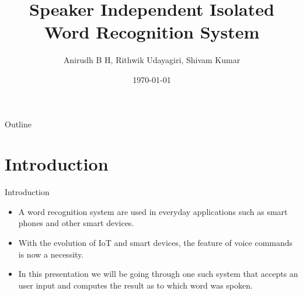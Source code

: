 \documentclass{beamer}
\title[Word Recognition]{Speaker Independent Isolated Word Recognition System}
\author[Anirudh, Rithwik, Shivam]{Anirudh B H, Rithwik Udayagiri, Shivam Kumar}
\institute[]{National Institue of Techology Karnataka}
\date{\today}
\begin{document}
\begin{frame}
  \titlepage
\end{frame}

\begin{frame}{Outline}
  \tableofcontents
\end{frame}

\section{Introduction}

\begin{frame}{Introduction}

\begin{itemize}
  \item A word recognition system are used in everyday applications such as smart phones and other smart devices.
  \item With the evolution of IoT and smart devices, the feature of voice commands is now a necessity.
  \item In this presentation we will be going through one such system that accepts an user input and computes the result as to which word was spoken.
\end{itemize}


\end{frame}
\end{document}
